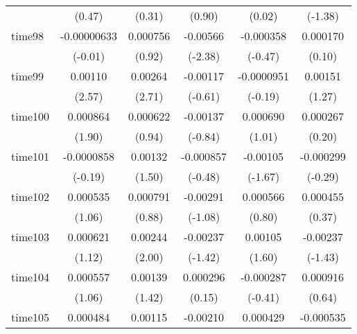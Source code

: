 \begin{table}[htbp]
\begin{tabular}{l*{5}{c}}
            &      (0.47)         &      (0.31)         &      (0.90)         &      (0.02)         &     (-1.38)         \\
time98      & -0.00000633         &    0.000756         &    -0.00566\sym{*}  &   -0.000358         &    0.000170         \\
            &     (-0.01)         &      (0.92)         &     (-2.38)         &     (-0.47)         &      (0.10)         \\
time99      &     0.00110\sym{*}  &     0.00264\sym{**} &    -0.00117         &  -0.0000951         &     0.00151         \\
            &      (2.57)         &      (2.71)         &     (-0.61)         &     (-0.19)         &      (1.27)         \\
time100     &    0.000864         &    0.000622         &    -0.00137         &    0.000690         &    0.000267         \\
            &      (1.90)         &      (0.94)         &     (-0.84)         &      (1.01)         &      (0.20)         \\
time101     &  -0.0000858         &     0.00132         &   -0.000857         &    -0.00105         &   -0.000299         \\
            &     (-0.19)         &      (1.50)         &     (-0.48)         &     (-1.67)         &     (-0.29)         \\
time102     &    0.000535         &    0.000791         &    -0.00291         &    0.000566         &    0.000455         \\
            &      (1.06)         &      (0.88)         &     (-1.08)         &      (0.80)         &      (0.37)         \\
time103     &    0.000621         &     0.00244\sym{*}  &    -0.00237         &     0.00105         &    -0.00237         \\
            &      (1.12)         &      (2.00)         &     (-1.42)         &      (1.60)         &     (-1.43)         \\
time104     &    0.000557         &     0.00139         &    0.000296         &   -0.000287         &    0.000916         \\
            &      (1.06)         &      (1.42)         &      (0.15)         &     (-0.41)         &      (0.64)         \\
time105     &    0.000484         &     0.00115         &    -0.00210         &    0.000429         &   -0.000535         \\

\end{tabular}
\end{table}
